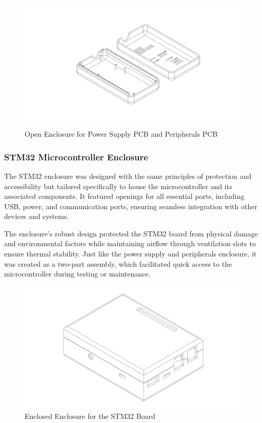 \documentclass[12pt]{article}
\begin{document}
\begin{figure}[H]
  \includegraphics[width=\textwidth]{../assets/pcb/image11.jpg}
  \caption{Open Enclosure for Power Supply PCB and Peripherals PCB}
\end{figure}


\subsubsection*{STM32 Microcontroller Enclosure}
The STM32 enclosure was designed with the same principles of protection and
accessibility but tailored specifically to house the microcontroller and its
associated components. It featured openings for all essential ports, including
USB, power, and communication ports, ensuring seamless integration with other
devices and systems.


The enclosure's robust design protected the STM32 board from physical damage
and environmental factors while maintaining airflow through ventilation slots
to ensure thermal stability. Just like the power supply and peripherals
enclosure, it was created as a two-part assembly, which facilitated quick
access to the microcontroller during testing or maintenance.

\begin{figure}[H]
  \includegraphics[width=\textwidth]{../assets/pcb/image12.jpg}
  \caption{Enclosed Enclosure for the STM32 Board}
\end{figure}
\end{document}
